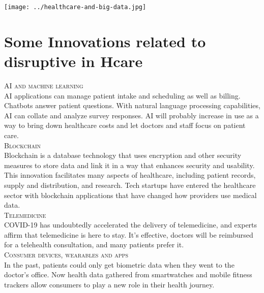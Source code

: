\documentclass[12pt]{article}
\begin{document}
\texttt{[image: ../healthcare-and-big-data.jpg]} 

\section{
\textbf{\large Some Innovations related to disruptive in Hcare}}
     
\begin{flushleft}

 
     
     
     
     
\textsc{\large AI and machine learning }	    \\
[0.35cm]
AI applications can manage patient intake and scheduling as well as billing. Chatbots answer patient questions. With natural language processing capabilities, AI can collate and analyze survey responses. AI will probably increase in use as a way to bring down healthcare costs and let doctors and staff focus on patient care.\\
[1cm]

\textsc{\large Blockchain            }	    \\
[0.35cm]

Blockchain is a database technology that uses encryption and other security measures to store data and link it in a way that enhances security and usability. This innovation facilitates many aspects of healthcare, including patient records, supply and distribution, and research. Tech startups have entered the healthcare sector with blockchain applications that have changed how providers use medical data. \\
[1cm]


\textsc{\large Telemedicine       }	    \\
[0.35cm]

COVID-19 has undoubtedly accelerated the delivery of telemedicine, and experts affirm that telemedicine is here to stay. It’s effective, doctors will be reimbursed for a telehealth consultation, and many patients prefer it.\\
[1cm]


      \textsc{\large Consumer devices, wearables and apps }	    \\
[0.35cm]
In the past, patients could only get biometric data when they went to the doctor's office. Now health data gathered from smartwatches and mobile fitness trackers allow consumers to play a new role in their health journey.



\end{flushleft}    
\end{document}
